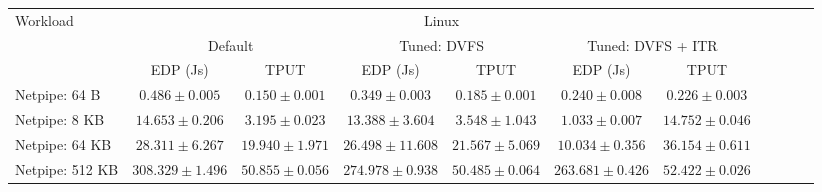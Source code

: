 \begin{table*}[t]
\begin{center}
\begin{tabular}{|l|cc|cc|cc||cc|cc} \hline
\multirow{2}{*}{Workload} & \multicolumn{6}{c|}{Linux} & \multirow{2}{*}{}\\ 
& \multicolumn{2}{c}{Default} & \multicolumn{2}{c}{Tuned: DVFS} & \multicolumn{2}{c|}{Tuned: DVFS + ITR} \\
\hline

 & EDP (Js)& TPUT & EDP (Js) & TPUT & EDP (Js) & TPUT \\  
 \hline

Netpipe: 64 B & $0.486 \pm 0.005$ & $0.150 \pm 0.001$ & $0.349 \pm 0.003$ & $0.185 \pm 0.001$ & $0.240 \pm 0.008$ & $0.226 \pm 0.003$ \\ \hline
Netpipe: 8 KB & $14.653 \pm 0.206$ & $3.195 \pm 0.023$ & $13.388 \pm 3.604$ & $3.548 \pm 1.043$ & $1.033 \pm 0.007$ & $14.752 \pm 0.046$ \\ \hline
Netpipe: 64 KB & $28.311 \pm 6.267$ & $19.940 \pm 1.971$ & $26.498 \pm 11.608$ & $21.567 \pm 5.069$ & $10.034 \pm 0.356$ & $36.154 \pm 0.611$ \\ \hline
Netpipe: 512 KB & $308.329 \pm 1.496$ & $50.855 \pm 0.056$ & $274.978 \pm 0.938$ & $50.485 \pm 0.064$ & $263.681 \pm 0.426$ & $52.422 \pm 0.026$ \\ \hline
\hline
\end{tabular}
\end{center}
\label{tab:netpipe_linux}
\end{table*}

